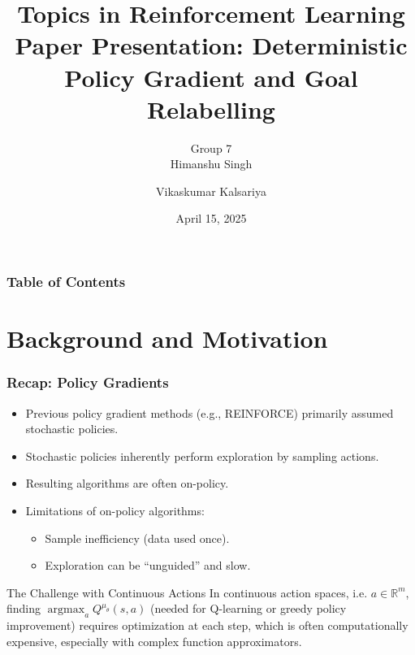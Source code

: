 \documentclass[9pt, aspectratio=169]{beamer}
\title[Deterministic Policy Gradient]{{\normalsize Topics in Reinforcement Learning} \\ \vspace{0.5em} Paper Presentation: Deterministic Policy Gradient and Goal Relabelling}
\author{Group 7 \\ \vspace{0.5em} Himanshu Singh \and Vikaskumar Kalsariya}
\date{April 15, 2025}
\newcommand{\pageauthor}{}
\begin{document}
\begin{frame}
  \titlepage
\end{frame}


\begin{frame}
  \frametitle{Table of Contents}
  \tableofcontents
\end{frame}


\section{Background and Motivation}
\renewcommand{\pageauthor}{Himanshu Singh}

\begin{frame}
  \frametitle{Recap: Policy Gradients}
  \begin{itemize}
    \item Previous policy gradient methods (e.g., REINFORCE) primarily assumed stochastic policies.
    \item Stochastic policies inherently perform exploration by sampling actions.
    \item Resulting algorithms are often on-policy.
    \item Limitations of on-policy algorithms:
      \begin{itemize}
          \item Sample inefficiency (data used once).
          \item Exploration can be ``unguided'' and slow.
      \end{itemize}
  \end{itemize}

  \begin{alertblock}{The Challenge with Continuous Actions}
      In continuous action spaces, i.e. $a \in \mathbb{R}^m$, finding $\operatorname*{argmax}_a Q^{\mu_\theta}(s, a)$ (needed for Q-learning or greedy policy improvement) requires optimization at each step, which is often computationally expensive, especially with complex function approximators.
  \end{alertblock}
\end{frame}
\end{document}
